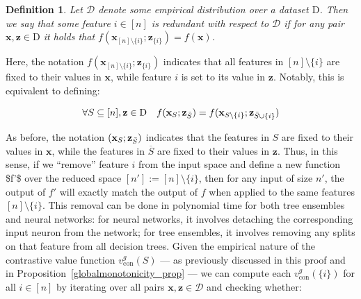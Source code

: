 \documentclass{article}
\newtheorem{definition}{Definition}
\newcommand{\z}{\textbf{z}}
\newcommand{\x}{\textbf{x}}
\begin{document}

\begin{definition}
    Let $\mathcal{D}$ denote some empirical distribution over a dataset $\text{D}$. Then we say that some feature $i\in[n]$ is \emph{redundant} with respect to $\mathcal{D}$ if for any pair $\x,\z\in\text{D}$ it holds that $f(\x_{[n]\setminus \{i\}};\z_{\{i\}})=f(\x)$.
\end{definition}


Here, the notation $f(\x_{[n]\setminus \{i\}};\z_{\{i\}})$ indicates that all features in $[n]\setminus\{i\}$ are fixed to their values in $\x$, while feature $i$ is set to its value in $\z$. Notably, this is equivalent to defining:


\begin{equation}
    \forall S\subseteq [n],\z\in\text{D} \quad f(\x_S;\z_{\Bar{S}})=f(\x_{S\setminus \{i\}};\z_{\Bar{S}\cup\{i\}})
\end{equation}


As before, the notation $(\x_S; \z_{\Bar{S}})$ indicates that the features in $S$ are fixed to their values in $\x$, while the features in $\overline{S}$ are fixed to their values in $\z$.
Thus, in this sense, if we ``remove'' feature $i$ from the input space and define a new function \$f'\$ over the reduced space $[n']:=[n]\setminus \{i\}$, then for any input of size $n'$, the output of $f'$ will exactly match the output of $f$ when applied to the same features $[n] \setminus \{i\}$. This removal can be done in polynomial time for both tree ensembles and neural networks: for neural networks, it involves detaching the corresponding input neuron from the network; for tree ensembles, it involves removing any splits on that feature from all decision trees. Given the empirical nature of the contrastive value function $v^g_{\text{con}}(S)$ --- as previously discussed in this proof and in Proposition~\ref{globalmonotonicity_prop} --- we can compute each $v^g_{\text{con}}(\{i\})$ for all $i \in [n]$ by iterating over all pairs $\x, \z \in \mathcal{D}$ and checking whether:
\end{document}
